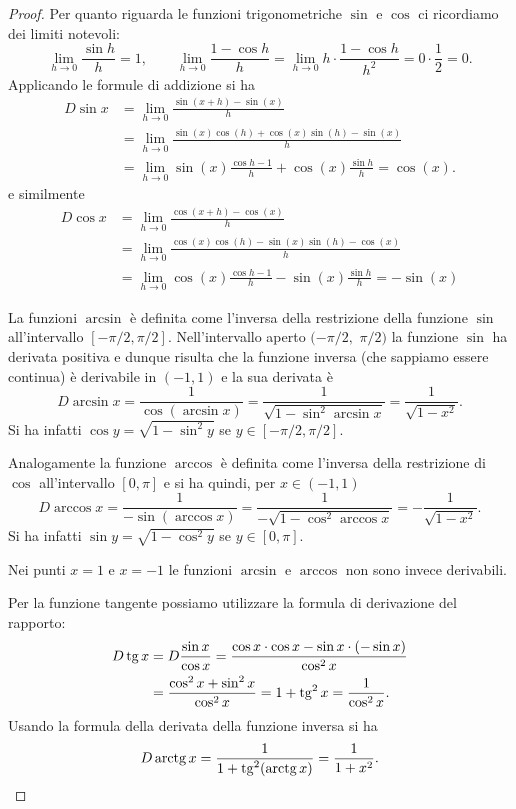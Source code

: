 \begin{proof}
Per quanto riguarda le funzioni trigonometriche $\sin$ e $\cos$ ci ricordiamo dei limiti notevoli:
\[
  \lim_{h\to 0}\frac{\sin h}{h} = 1,\qquad
  \lim_{h\to 0}\frac{1-\cos h}{h}
  =\lim_{h\to 0}h \cdot \frac{1-\cos h}{h^2} = 0 \cdot \frac{1}{2} = 0.
\]
Applicando le formule di addizione si ha
\begin{align*}
  D \sin x
  &= \lim_{h\to 0}\frac{\sin(x+h)-\sin(x)}{h} \\
  &= \lim_{h\to 0}\frac{\sin(x)\cos(h) + \cos(x)\sin(h) - \sin(x)}{h} \\
  &= \lim_{h\to 0}\sin(x) \frac{\cos h-1}{h} + \cos(x) \frac{\sin h}{h} = \cos(x).
\end{align*}
e similmente
\begin{align*}
  D \cos x
  &= \lim_{h\to 0}\frac{\cos(x+h)-\cos(x)}{h} \\
  &= \lim_{h\to 0}\frac{\cos(x)\cos(h) - \sin(x)\sin(h) - \cos(x)}{h} \\
  &= \lim_{h\to 0}\cos(x) \frac{\cos h-1}{h} - \sin(x) \frac{\sin h}{h} = -\sin(x)
\end{align*}

La funzioni $\arcsin$ è definita come l'inversa della restrizione della funzione $\sin$ all'intervallo $[-\pi/2, \pi/2]$.
Nell'intervallo aperto $(-\pi/2,$ $\pi/2)$ la funzione $\sin$ ha derivata positiva e dunque risulta che la funzione inversa (che sappiamo essere continua) è derivabile in $(-1,1)$ e la sua derivata è
\[
D\arcsin x
= \frac{1}{\cos(\arcsin x)}
= \frac{1}{\sqrt{1-\sin^2 \arcsin x}}
= \frac{1}{\sqrt{1-x^2}}.
\]
Si ha infatti $\cos y = \sqrt{1-\sin^2 y}$ se $y\in [-\pi/2, \pi/2]$.

Analogamente la funzione $\arccos$ è definita come l'inversa della restrizione di $\cos$ all'intervallo $[0,\pi]$ e si ha quindi,
per $x\in (-1,1)$
\[
D \arccos x
 = \frac{1}{-\sin(\arccos x)}
 = \frac{1}{-\sqrt{1-\cos^2 \arccos x}}
 = -\frac{1}{\sqrt{1-x^2}}.
\]
Si ha infatti $\sin y = \sqrt{1-\cos^2 y}$ se $y\in[0,\pi]$.

Nei punti $x=1$ e $x=-1$ le funzioni $\arcsin$ e $\arccos$ non sono invece derivabili.

Per la funzione tangente possiamo utilizzare la formula di derivazione del rapporto:
\begin{align*}
  D \operatorname{tg} x &= D \frac{\sin x }{\cos x}
   = \frac{\cos x \cdot \cos x - \sin x \cdot (-\sin x)}{\cos^2 x} \\
   &= \frac{\cos^2 x + \sin^2 x}{\cos^2 x}
   = 1 + \operatorname{tg}^2 x = \frac{1}{\cos^2 x}.
\end{align*}
Usando la formula della derivata della funzione inversa si ha
\[
  D \operatorname{arctg} x = \frac{1}{1+\operatorname{tg}^2(\operatorname{arctg} x)}
  = \frac{1}{1+x^2}.
\]


\end{proof}
